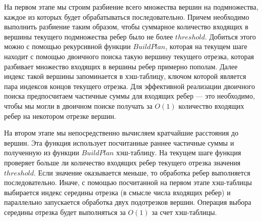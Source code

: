 На первом этапе мы строим разбиение всего множества вершин на подмножества, каждое из которых будет обрабатываться последовательно. Причем необходимо выполнить разбиение таким образом, чтобы суммарное количество входящих в вершины текущего подмножества ребер было не более $threshold$. Добиться этого можно с помощью рекурсивной функции $BuildPlan$, которая на текущем шаге находит с помощью двоичного поиска такую вершину текущего отрезка, которая разбивает множество входящих в вершины ребер примерно пополам. Далее индекс такой вершины запоминается в хэш-таблицу, ключом которой является пара индексов концов текущего отрезка. Для эффективной реализации двоичного поиска предпосчитаем частичные суммы для входящих ребер --- это необходимо, чтобы мы могли в двоичном поиске получать за $O(1)$ количество входящих ребер на некотором отрезке вершин. 

\FloatBarrier


На втором этапе мы непосредственно вычисляем кратчайшие расстояния до вершин. Эта функция использует посчитанные раннее частичные суммы и полученную из функции $BuildPlan$ хэш-таблицу. На текущем шаге функция проверяет больше ли количество входящих ребер текущего отрезка значения $threshold$. Если значение оказывается меньше, то обработка ребер выполняется последовательно. Иначе, с помощью посчитанной на первом этапе хэш-таблицы выбирается индекс середины отрезка (в смысле числа входящих ребер) и параллельно запускается обработка двух подотрезков вершин. Операция выбора середины отрезка будет выполняться за $O(1)$ за счет хэш-таблицы.


